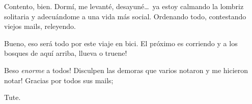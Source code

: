 Contento, bien. Dorm\'i, me levant\'e, desayun\'e\ldots\ ya estoy calmando la
lombriz solitaria y adecu\'andome a una vida m\'as social. Ordenando todo,
contestando viejos mails, releyendo.

Bueno, eso ser\'a todo por este viaje en bici. \textexclamdown El pr\'oximo es
corriendo y a los bosques de aqu\'i arriba, llueva o truene!

\textexclamdown Beso \emph{enorme} a todos! \textexclamdown Disculpen las
demoras que varios notaron y me hicieron notar! Gracias por todos sus mails;

Tute.
